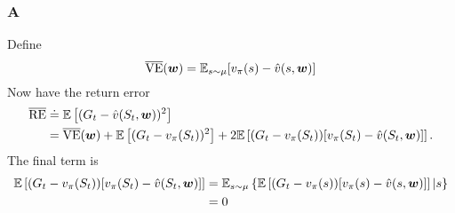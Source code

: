 \subsubsection*{A}
Define
\[
    \overline{\mathrm{VE}}(\boldsymbol{w}) = \mathbb{E}{}_{s\sim\mu}[v_\pi(s) - \hat{v}(s, \boldsymbol{w})]
\]
Now have the return error
\begin{align}
    \overline{\mathrm{RE}} &\doteq \mathbb{E}{}\left[ (G_t - \hat{v}(S_t, \boldsymbol{w}))^2 \right] \\
    &= \overline{\mathrm{VE}}(\boldsymbol{w}) + \mathbb{E}{}\left[ (G_t - v_\pi(S_t))^2 \right] + 2 \mathbb{E}{}\left[ (G_t - v_\pi(S_t))[v_\pi(S_t) - \hat{v}(S_t, \boldsymbol{w})] \right].
\end{align}
The final term is
\begin{align}
    \mathbb{E}{}\left[ (G_t - v_\pi(S_t))[v_\pi(S_t) - \hat{v}(S_t, \boldsymbol{w})] \right] &= \mathbb{E}{}_{s \sim \mu}\left\{\mathbb{E}{}\left[ (G_t - v_\pi(s))[v_\pi(s) - \hat{v}(s, \boldsymbol{w})] \right]\vert{} s\right\}\\
                  &= 0
\end{align}
